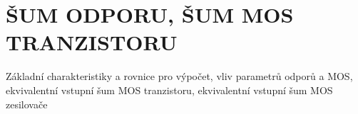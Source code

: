 \section{ŠUM ODPORU, ŠUM MOS TRANZISTORU }
Základní charakteristiky a rovnice pro výpočet, vliv parametrů odporů a MOS, ekvivalentní vstupní šum MOS tranzistoru, ekvivalentní vstupní šum MOS zesilovače